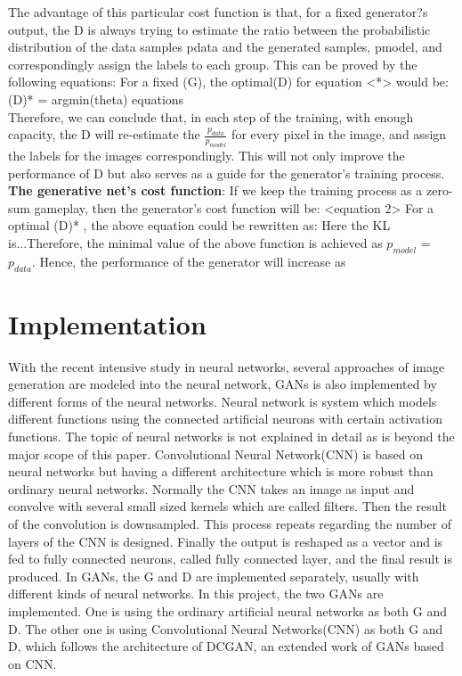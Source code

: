 \documentclass[10pt,twocolumn,letterpaper]{article}
\begin{document}
The advantage of this particular cost function is that, for a fixed generator?s output, the D is always trying to estimate the ratio between the probabilistic distribution of the data samples pdata and the generated samples, pmodel, and correspondingly assign the labels to each group. This can be proved by the following equations:
For a fixed (G), the optimal(D) for equation <*> would be:
 		(D)* = argmin(theta) equations ~\\
		
Therefore, we can conclude that, in each step of the training, with enough capacity, the D will re-estimate the $\frac{p_{data}}{p_{model}}$ for every pixel in the image, and assign the labels for the images correspondingly.  This will not only improve the performance of D but also serves as a guide for the generator's training process.\\

\textbf{The generative net's cost function}:
If we keep the training process as a zero-sum gameplay, then the generator's cost function will be:
<equation 2> 
For a optimal (D)* , the above equation could be rewritten as:
Here the KL is...Therefore, the minimal value of the above function is achieved as $p_{model}$ = $p_{data}$. Hence, the performance of the generator will increase as   

\section{Implementation}
With the recent intensive study in neural networks, several approaches of image generation are modeled into the neural network, GANs is also implemented by different forms of the neural networks. 
Neural network\cite{ding1996neural} is system which models different functions using the connected artificial neurons with certain activation functions. The topic of neural networks is not explained in detail as is beyond the major scope of this paper. Convolutional Neural Network(CNN)\cite{krizhevsky2012imagenet} is based on neural networks but having a different architecture which is more robust than ordinary neural networks. Normally the CNN takes an image as input and convolve with several small sized kernels which are called filters. Then the result of the convolution is downsampled. This process repeats regarding the number of layers of the CNN is designed. Finally the output is reshaped as a vector and is fed to fully connected neurons, called fully connected layer, and the final result is produced.
In GANs, the G and D are implemented separately, usually with different kinds of neural networks. In this project, the two GANs are implemented. One is using the ordinary artificial neural networks as both G and D. The other one is using Convolutional Neural Networks(CNN) as both G and D, which follows the architecture of DCGAN\cite{radford2015unsupervised}, an extended work of GANs based on CNN.
\end{document}

